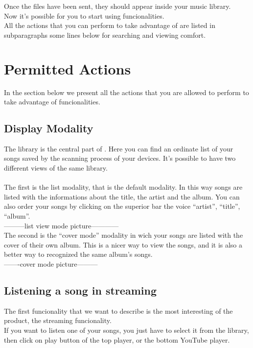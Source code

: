Once the files have been sent, they should appear inside your music library.\\
Now it's possible for you to start using  funcionalities.\\
All the actions that you can perform to take advantage of  are listed
in subparagraphs some lines below for searching and viewing comfort.


\section{Permitted Actions}
In the section below we present all the actions that you are allowed to perform
to take advantage of  funcionalities.

\subsection{Display Modality}

The library is the central part of . Here you can find an ordinate
list of your songs saved by the scanning process of your devices. It's possible
to have two different views of the same library.\\
\\
The first is the list modality, that is the default modality. In this
way songs are listed with the informations about the title, the artist and the
album. You can also order your songs by clicking on the superior bar the voice
``artist'', ``title'', ``album''.\\

---------list view mode picture------------
\\

The second is the ``cover mode'' modality in wich your songs are listed with the
cover of their own album. This is a nicer way to view the songs, and it is also
a better way to recognized the same album's songs.\\

-------cover mode picture---------
\\

 \subsection*{Listening a song in streaming}

The first funcionality that we want to describe is the most interesting of the
product, the streaming funcionality.\\
If you want to listen one of your songs, you just have to select it from the
library, then click on play button of the top player, or the
bottom YouTube player.\\


